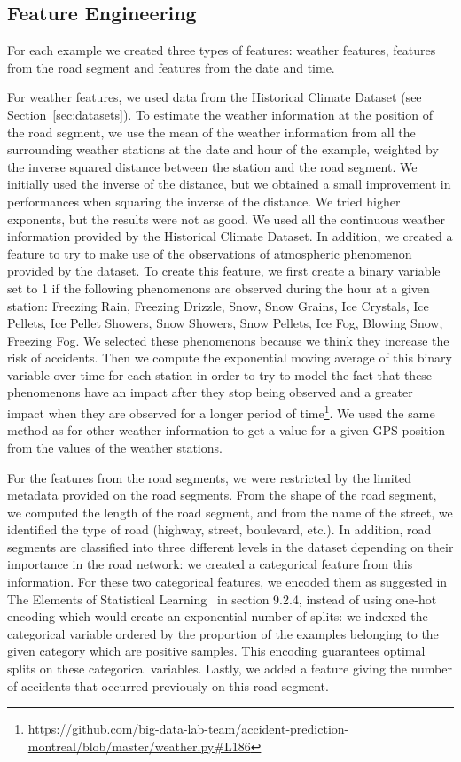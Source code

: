 \documentclass[conference]{IEEEtran}
\begin{document}
\subsection{Feature Engineering}

For each example we created three types of features: weather features,
features from the road segment and features from the date and time.

For weather features, we used data from the Historical Climate Dataset (see Section~\ref{sec:datasets}).
To estimate the weather information at the position of the road
segment, we use the mean of the weather information from all the
surrounding weather stations at the date and hour of the example, weighted
by the inverse squared distance between the station and the
road segment. We initially used the inverse of the distance, but we
obtained a small improvement in performances when squaring the inverse of
the distance. We tried higher exponents, but the results were not as good.
We used all the continuous weather information provided
by the Historical Climate Dataset. In addition, we created a feature to try
to make use of the observations of atmospheric phenomenon provided by the dataset.
To create this feature, we first create a binary variable set to 1 if the
following phenomenons are observed during the hour at a given station:
Freezing Rain, Freezing Drizzle, Snow, Snow Grains, Ice Crystals, Ice Pellets,
Ice Pellet Showers, Snow Showers, Snow Pellets, Ice Fog, Blowing Snow, Freezing
Fog. We selected these phenomenons because we think they increase the risk of
accidents. Then we compute the exponential moving average of this binary
variable over time for each station in order to try to model the fact that
these phenomenons have an impact after they stop being observed and a greater
impact when they are observed for a longer period of time\footnote{\url{https://github.com/big-data-lab-team/accident-prediction-montreal/blob/master/weather.py\#L186}}. We used the
same method as for other weather information to get a value for a given 
GPS position from the values of the weather stations.

For the features from the road segments, we were restricted by the limited
metadata provided on the road segments. From the shape of the road segment,
we computed the length of the road segment, and from the name of the
street, we identified the type of road (highway, street, boulevard, etc.).
In addition, road segments are classified into three different levels in
the dataset depending on their importance in the road network: we created a
categorical feature from this information. For these two categorical
features, we encoded them as suggested in The Elements of Statistical
Learning~\cite{elementsofstat} in section 9.2.4, instead of using one-hot
encoding which would create an exponential number of splits: we indexed the
categorical variable ordered by the proportion of the examples belonging to
the given category which are positive samples. This encoding guarantees 
optimal splits on these categorical variables. Lastly, we added a
feature giving the number of accidents that occurred previously on this
road segment.
\end{document}

